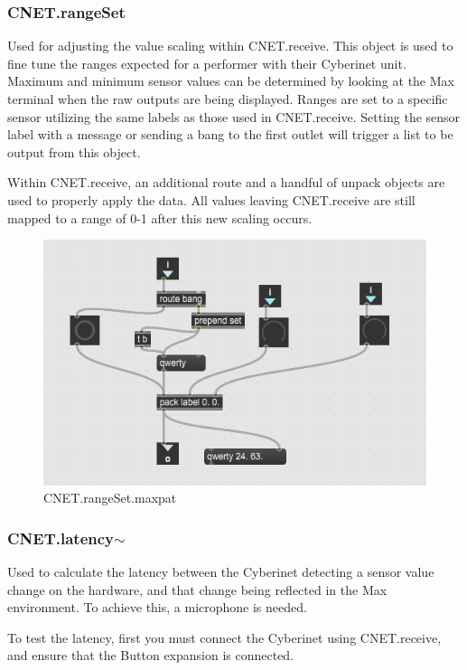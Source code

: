 \subsubsection{CNET.rangeSet}
Used for adjusting the value scaling within CNET.receive. This object is used to fine tune the ranges expected for a performer with their Cyberinet unit. Maximum and minimum sensor values can be determined by looking at the Max terminal when the raw outputs are being displayed. Ranges are set to a specific sensor utilizing the same labels as those used in CNET.receive. Setting the sensor label with a message or sending a bang to the first outlet will trigger a list to be output from this object.

Within CNET.receive, an additional route and a handful of unpack objects are used to properly apply the data. All values leaving CNET.receive are still mapped to a range of 0-1 after this new scaling occurs.

\begin{figure}
    \centering
    \includegraphics{diagrams/maxPatches/CNET.rangeSet.png}
    \caption{CNET.rangeSet.maxpat}
    \label{fig:CNET.rangeSet.maxpatch}
\end{figure}

\subsubsection{CNET.latency$\sim$}
Used to calculate the latency between the Cyberinet detecting a sensor value change on the hardware, and that change being reflected in the Max environment. To achieve this, a microphone is needed. 

To test the latency, first you must connect the Cyberinet using CNET.receive, and ensure that the Button expansion is connected. 

